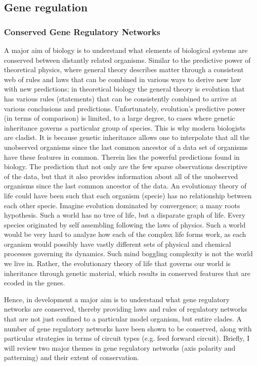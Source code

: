  

\subsection{Gene regulation}

  
\subsubsection{Conserved Gene Regulatory Networks}
	A major aim of biology is to understand what elements of biological systems are conserved between distantly related organisms.  Similar to the predictive power of theoretical physics, where general theory describes matter through a consistent web of rules and laws that can be combined in various ways to derive new law with new predictions; in theoretical biology the general theory is evolution that has various rules (statements) that can be consistently combined to arrive at various conclusions and predictions.  Unfortunately, evolution's predictive power (in terms of comparison) is limited, to a large degree, to cases where genetic inheritance governs a particular group of species.  This is why modern biologists are cladist.  It is because genetic inheritance allows one to interpolate that all the unobserved organisms since the last common ancestor of a data set of organisms have these features in common.  Therein lies the powerful predictions found in biology.  The prediction that not only are the few sparse observations descriptive of the data, but that it also provides information about all of the unobserved organisms since the last common ancestor of the data.
	An evolutionay theory of life could have been such that each organism (specie) has no relationship between each other specie.  Imagine evolution dominated by convergence; a many roots hypothesis.  Such a world has no tree of life, but a disparate graph of life. Every species originated by self assembling following the laws of physics.  Such a world would be very hard to analyze how each of the complex life forms work, as each organism would possibly have vastly different sets of physical and chemical processes governing its dynamics.  Such mind boggling complexity is not the world we live in.  Rather, the evolutionary theory of life that governs our world is inheritance through genetic material, which results in conserved features that are ecoded in the genes.  
	
	  Hence, in development a major aim is to understand what gene regulatory networks are conserved, thereby providing laws and rules of regulatory networks that are not just confined to a particular model organism, but entire clades.  A number of gene regulatory networks have been shown to be conserved, along with particular strategies in terms of circuit types (e.g. feed forward circuit).  Briefly, I will review two major themes in gene regulatory networks (axis polarity and patterning) and their extent of conservation.
